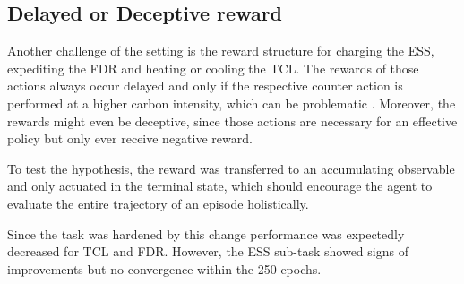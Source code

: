 \subsection{Delayed or Deceptive reward}
Another challenge of the setting is the reward structure for charging the ESS, expediting the FDR and heating or cooling the TCL. The rewards of those actions always occur delayed and only if the respective counter action is performed at a higher carbon intensity, which can be problematic \cite{Sutton.1984}. Moreover, the rewards might even be deceptive, since those actions are necessary for an effective policy but only ever receive negative reward.
\par
To test the hypothesis, the reward was transferred to an accumulating observable and only actuated in the terminal state, which should encourage the agent to evaluate the entire trajectory of an episode holistically.
\par 
Since the task was hardened by this change performance was expectedly decreased for TCL and FDR. However, the ESS sub-task showed signs of improvements but no convergence within the 250 epochs.